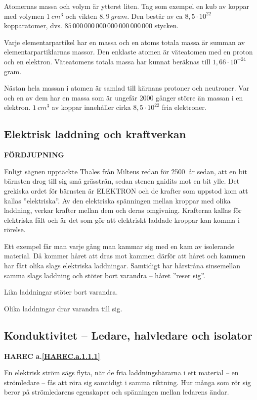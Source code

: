 Atomernas massa och volym är ytterst liten.
Tag som exempel en kub av koppar med volymen \(1\ cm^3\) och vikten
\(8,9\ gram\).
Den består av ca \(8,5 \cdot 10^{22}\) kopparatomer, dvs.
\(85\, 000\, 000\, 000\, 000\, 000\, 000\, 000\) stycken.

Varje elementarpartikel har en massa och en atoms totala massa är summan av
elementarpartiklarnas massor.
Den enklaste atomen är väteatomen med en proton och en elektron.
Väteatomens totala massa har kunnat beräknas till \(1,66 \cdot 10^{-24}\) gram.

Nästan hela massan i atomen är samlad till kärnans protoner och neutroner.
Var och en av dem har en massa som är ungefär 2000 gånger större än massan i en
elektron.
\(1\ cm^3\) av koppar innehåller cirka \(8,5 \cdot 10^{22}\) fria elektroner.

\subsection{Elektrisk laddning och kraftverkan}
\textbf{FÖRDJUPNING}

Enligt sägnen upptäckte Thales från Milteus redan för 2500~år sedan, att en bit
bärnsten drog till sig små grässtrån, sedan stenen gnidits mot en bit ylle.
Det grekiska ordet för bärnsten är ELEKTRON och de krafter som uppstod kom att
kallas ''elektriska''.
Av den elektriska spänningen mellan kroppar med olika laddning, verkar krafter
mellan dem och deras omgivning.
Krafterna kallas för elektriska fält och är det som gör att elektriskt laddade
kroppar kan komma i rörelse.

Ett exempel får man varje gång man kammar sig med en kam av isolerande material.
Då kommer håret att dras mot kammen därför att håret och kammen har
fått olika slags elektriska laddningar.
Samtidigt har hårstråna sinsemellan samma slags laddning och stöter bort
varandra -- håret ''reser sig''.

Lika laddningar stöter bort varandra.

Olika laddningar drar varandra till sig.

\subsection{Konduktivitet -- Ledare, halvledare och isolator}
\textbf{HAREC a.\ref{HAREC.a.1.1.1}\label{myHAREC.a.1.1.1}}

En elektrisk ström sägs flyta, när de fria laddningsbärarna i ett material -- en
strömledare -- fås att röra sig samtidigt i samma riktning.
Hur många som rör sig beror på strömledarens egenskaper och spänningen mellan
ledarens ändar.


